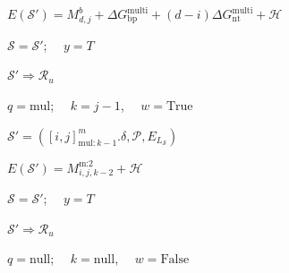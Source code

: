 \documentclass[11pt,letterpaper]{article}  \usepackage[margin=1in]{geometry}
\theoremstyle{definition}  \newtheorem{Definition}[theorem]{Definition}
\begin{document}
\begin{algorithm}
\begin{algorithmic}[1]
		\State $E(\mathcal{S}') = M^b_{d,j} + \Delta G_\text{bp}^\text{multi}+ (d-i) \Delta G_\text{nt}^\text{multi} + \mathcal{H}$
		
		
		
		
		\State $\mathcal{S} = \mathcal{S}'$; \ \  $y = T$
		
		\Else
		
		\State $\mathcal{S}' \Rightarrow \mathcal{R}_u$		
		\EndIf
		
		
		
		\EndIf
		
		
		\EndFor
		\EndIf
		
		
		\State $q = \text{mul}$; \ \ $k = j-1$, \ \ $w= \mathrm{True}$
		\EndIf	
		
		
		\State  $\mathcal{S}' = ([i,j]^m_{\text{mul}:k-1}.\delta, \mathcal{P}, E_{L_{\mathcal{S}}})$ 
		
		\State $E(\mathcal{S}') = M_{i,j,k-2}^\text{m:2} + \mathcal{H}$
		
		
		
		\State $\mathcal{S} = \mathcal{S}'$; \ \  $y = T$
		
		\Else
		
		\State $\mathcal{S}' \Rightarrow \mathcal{R}_u$		
		\EndIf
		
		\EndIf
		
		\EndIf
		
		\State $q = \text{null}$; \ \ $k = \text{null}$, \ \ $w= \mathrm{False}$ 
		\EndIf	
		
		
		
		
	\end{algorithmic}
\end{algorithm}
\end{document}
